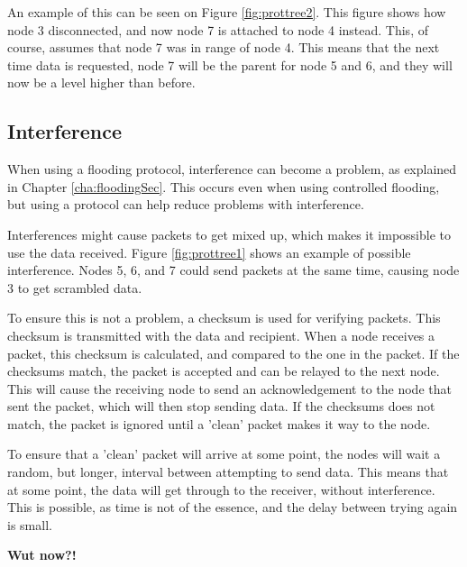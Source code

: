 An example of this can be seen on Figure \ref{fig:prottree2}. This figure shows how node 3 disconnected, and now node 7 is attached to node 4 instead. This, of course, assumes that node 7 was in range of node 4.
This means that the next time data is requested, node 7 will be the parent for node 5 and 6, and they will now be a level higher than before.

\subsection*{Interference}
When using a flooding protocol, interference can become a problem, as explained in Chapter \ref{cha:floodingSec}. This occurs even when using controlled flooding, but using a protocol can help reduce problems with interference.

Interferences might cause packets to get mixed up, which makes it impossible to use the data received. Figure \ref{fig:prottree1} shows an example of possible interference. Nodes 5, 6, and 7 could send packets at the same time, causing node 3 to get scrambled data.

To ensure this is not a problem, a checksum is used for verifying packets. This checksum is transmitted with the data and recipient. When a node receives a packet, this checksum is calculated, and compared to the one in the packet. If the checksums match, the packet is accepted and can be relayed to the next node. This will cause the receiving node to send an acknowledgement to the node that sent the packet, which will then stop sending data.
If the checksums does not match, the packet is ignored until a 'clean' packet makes it way to the node.

To ensure that a 'clean' packet will arrive at some point, the nodes will wait a random, but longer, interval between attempting to send data. This means that at some point, the data will get through to the receiver, without interference.
This is possible, as time is not of the essence, and the delay between trying again is small.

\textbf{Wut now?!}
